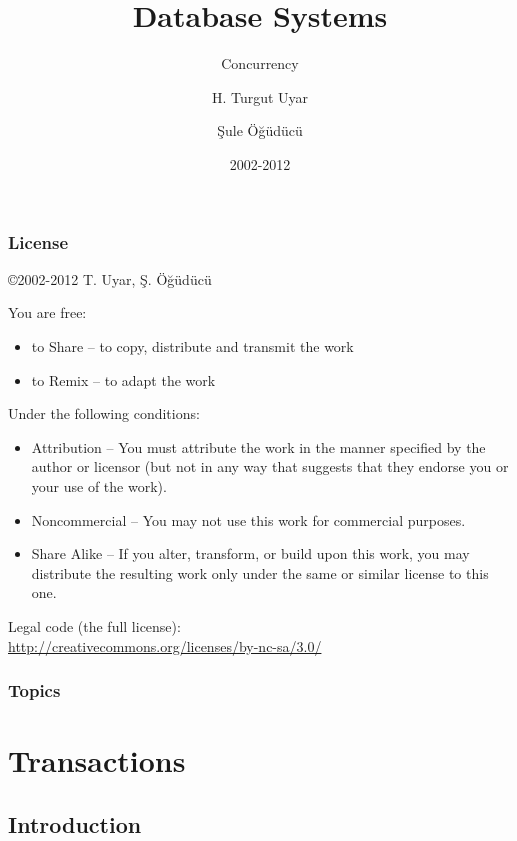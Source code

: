 \documentclass[dvipsnames]{beamer}
\title{Database Systems}
\subtitle{Concurrency}
\author{H. Turgut Uyar \and Şule Öğüdücü}
\date{2002-2012}
\theoremstyle{plain}
\begin{document}
\begin{frame}
  \titlepage
\end{frame}

\begin{frame}
  \frametitle{License}

  \hfill
  \copyright 2002-2012 T. Uyar, Ş. Öğüdücü

  \vfill
  \begin{tiny}
    You are free:
    \begin{itemize}
      \item to Share -- to copy, distribute and transmit the work
      \item to Remix -- to adapt the work
    \end{itemize}

    Under the following conditions:
    \begin{itemize}
      \item Attribution -- You must attribute the work in the manner specified by
        the author or licensor (but not in any way that suggests that they
        endorse you or your use of the work).

      \item Noncommercial -- You may not use this work for commercial purposes.

      \item Share Alike -- If you alter, transform, or build upon this work, you
        may distribute the resulting work only under the same or similar license
        to this one.
    \end{itemize}
  \end{tiny}

  \vfill
  Legal code (the full license):\\
  \url{http://creativecommons.org/licenses/by-nc-sa/3.0/}
\end{frame}

\begin{frame}
  \frametitle{Topics}
  \tableofcontents
\end{frame}

\section{Transactions}

\subsection{Introduction}
\end{document}
